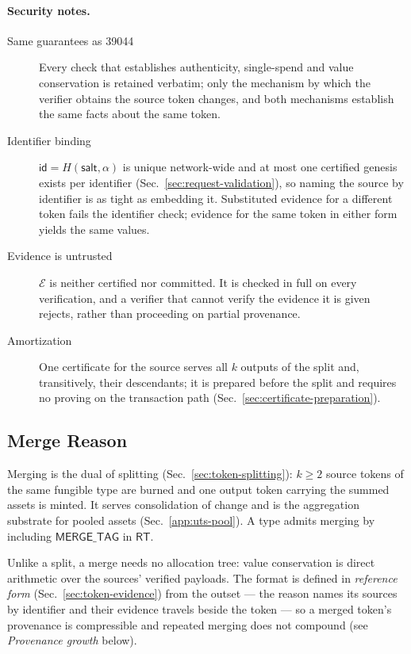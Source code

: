 \paragraph{Security notes.}
\begin{description}
	\item[Same guarantees as 39044] Every check that establishes authenticity, single-spend and value conservation is retained verbatim; only the mechanism by which the verifier obtains the source token changes, and both mechanisms establish the same facts about the same token.
	\item[Identifier binding] $\mathsf{id} = H(\mathsf{salt}, \alpha)$ is unique network-wide and at most one certified genesis exists per identifier (Sec.~\ref{sec:request-validation}), so naming the source by identifier is as tight as embedding it. Substituted evidence for a different token fails the identifier check; evidence for the same token in either form yields the same values.
	\item[Evidence is untrusted] $\mathcal{E}$ is neither certified nor committed. It is checked in full on every verification, and a verifier that cannot verify the evidence it is given rejects, rather than proceeding on partial provenance.
	\item[Amortization] One certificate for the source serves all $k$ outputs of the split and, transitively, their descendants; it is prepared before the split and requires no proving on the transaction path (Sec.~\ref{sec:certificate-preparation}).
\end{description}

\subsection{Merge Reason}\label{app:reason-merge}

Merging is the dual of splitting (Sec.~\ref{sec:token-splitting}): $k \ge 2$ source tokens of the same fungible type are burned and one output token carrying the summed assets is minted. It serves consolidation of change and is the aggregation substrate for pooled assets (Sec.~\ref{app:uts-pool}). A type admits merging by including $\mathsf{MERGE\_TAG}$ in $\mathsf{RT}$.

Unlike a split, a merge needs no allocation tree: value conservation is direct arithmetic over the sources' verified payloads. The format is defined in \emph{reference form} (Sec.~\ref{sec:token-evidence}) from the outset --- the reason names its sources by identifier and their evidence travels beside the token --- so a merged token's provenance is compressible and repeated merging does not compound (see \emph{Provenance growth} below).


